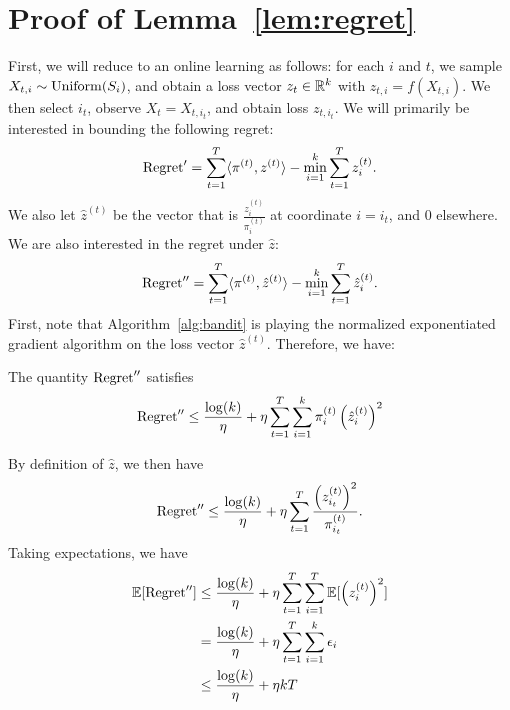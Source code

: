 \documentclass[anon,12pt]{colt2016} %
\begin{document}
\acks{}



\appendix

\section{Proof of Lemma~\ref{lem:regret}}
\label{sec:regret-proof}
First, we will reduce to an online learning as follows: 
for each $i$ and $t$, we sample 
$X_{t,i} \sim \operatorname{Uniform}(S_{i})$, and obtain a loss 
vector $z_{t} \in \mathbb{R}^k$ with $z_{t,i} = f(X_{t,i})$. 
We then select $i_t$, observe $X_t = X_{t,i_t}$, and obtain loss 
$z_{t,i_t}$.
We will primarily be interested in bounding the following regret:
\newcommand{\Regi}{\Regret'}
\newcommand{\Regii}{\Regret''}
\begin{equation}
\Regi = \sum_{t=1}^T \langle \pi^{(t)}, z^{(t)} \rangle - \min_{i=1}^k \sum_{t=1}^T z_i^{(t)}.
\end{equation}
We also let $\hat{z}^{(t)}$ be the vector that is $\frac{z_i^{(t)}}{\pi_i^{(t)}}$ 
at coordinate $i = i_t$, and $0$ elsewhere. We are also interested in the 
regret under $\hat{z}$:
\begin{equation}
\Regii = \sum_{t=1}^T \langle \pi^{(t)}, \hat{z}^{(t)} \rangle - \min_{i=1}^k \sum_{t=1}^T \hat{z}_i^{(t)}.
\end{equation}
First, note that Algorithm~\ref{alg:bandit} is playing the normalized
exponentiated gradient algorithm on the loss vector $\hat{z}^{(t)}$. Therefore, 
we have:
\begin{lemma}
The quantity $\Regii$ satisfies
\begin{equation}
\Regii \leq \frac{\log(k)}{\eta} + \eta \sum_{t=1}^T \sum_{i=1}^k \pi_{i}^{(t)} \p{\hat{z}_{i}^{(t)}}^2
\end{equation}
\end{lemma}
By definition of $\hat{z}$, we then have
\begin{equation}
\Regii \leq \frac{\log(k)}{\eta} + \eta \sum_{t=1}^T \frac{\Big(z_{i_t}^{(t)}\Big)^2}{\pi_{i_t}^{(t)}}.
\end{equation}
Taking expectations, we have
\begin{align}
\bE[\Regii] &\leq \frac{\log(k)}{\eta} + \eta \sum_{t=1}^T \sum_{i=1}^T \bE[\p{z_i^{(t)}}^2] \\
 &= \frac{\log(k)}{\eta} + \eta \sum_{t=1}^T \sum_{i=1}^k \epsilon_i \\
 &\leq \frac{\log(k)}{\eta} + \eta kT
\end{align}
\end{document}

